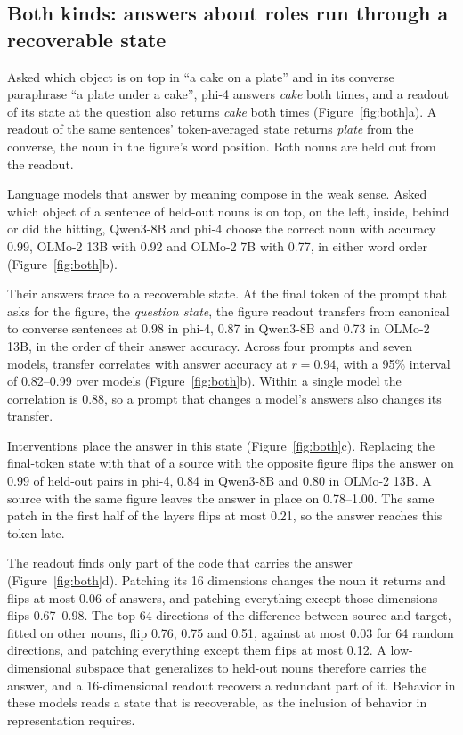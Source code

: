 \documentclass[10pt]{article}
\theoremstyle{plain}
\theoremstyle{remark}
\begin{document}
\subsection{Both kinds: answers about roles run through a recoverable state}
\label{sec:behavior}

Asked which object is on top in ``a cake on a plate'' and in its converse paraphrase ``a plate under a cake'', phi-4 answers \emph{cake} both times, and a readout of its state at the question also returns \emph{cake} both times (Figure~\ref{fig:both}a). A readout of the same sentences' token-averaged state returns \emph{plate} from the converse, the noun in the figure's word position. Both nouns are held out from the readout.

Language models that answer by meaning compose in the weak sense. Asked which object of a sentence of held-out nouns is on top, on the left, inside, behind or did the hitting, Qwen3-8B and phi-4 choose the correct noun with accuracy 0.99, OLMo-2 13B with 0.92 and OLMo-2 7B with 0.77, in either word order (Figure~\ref{fig:both}b).

Their answers trace to a recoverable state. At the final token of the prompt that asks for the figure, the \emph{question state}, the figure readout transfers from canonical to converse sentences at 0.98 in phi-4, 0.87 in Qwen3-8B and 0.73 in OLMo-2 13B, in the order of their answer accuracy. Across four prompts and seven models, transfer correlates with answer accuracy at $r = 0.94$, with a 95\% interval of 0.82--0.99 over models (Figure~\ref{fig:both}b). Within a single model the correlation is 0.88, so a prompt that changes a model's answers also changes its transfer.

Interventions place the answer in this state (Figure~\ref{fig:both}c). Replacing the final-token state with that of a source with the opposite figure flips the answer on 0.99 of held-out pairs in phi-4, 0.84 in Qwen3-8B and 0.80 in OLMo-2 13B. A source with the same figure leaves the answer in place on 0.78--1.00. The same patch in the first half of the layers flips at most 0.21, so the answer reaches this token late.

The readout finds only part of the code that carries the answer (Figure~\ref{fig:both}d). Patching its 16 dimensions changes the noun it returns and flips at most 0.06 of answers, and patching everything except those dimensions flips 0.67--0.98. The top 64 directions of the difference between source and target, fitted on other nouns, flip 0.76, 0.75 and 0.51, against at most 0.03 for 64 random directions, and patching everything except them flips at most 0.12. A low-dimensional subspace that generalizes to held-out nouns therefore carries the answer, and a 16-dimensional readout recovers a redundant part of it. Behavior in these models reads a state that is recoverable, as the inclusion of behavior in representation requires.
\end{document}
